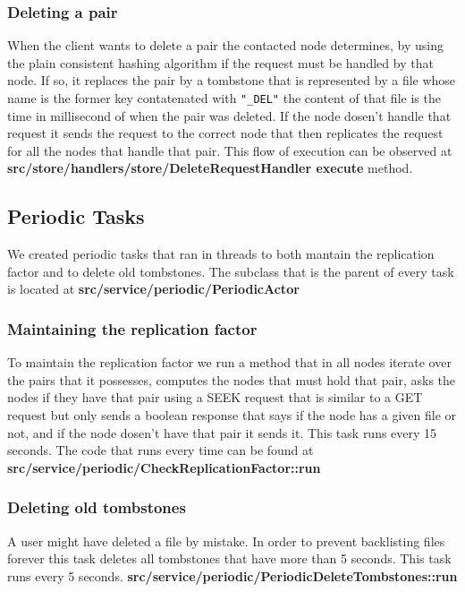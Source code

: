 \subsubsection{Deleting a pair}
When the client wants to delete a pair the contacted node determines, by using the plain consistent hashing algorithm if the request must be handled by that node. If so, it replaces the pair by a tombstone that is represented by a file whose name is the former key contatenated with \texttt{"\_DEL"} the content of that file is the time in millisecond of when the pair was deleted. If the node dosen't handle that request it sends the request to the correct node that then replicates the request for all the nodes that handle that pair. This flow of execution can be observed at \textbf{src/store/handlers/store/DeleteRequestHandler execute} method.

\subsection{Periodic Tasks}
We created periodic tasks that ran in threads to both mantain the replication factor and to delete old tombstones. The subclass that is the parent of every task is located at \textbf{src/service/periodic/PeriodicActor}
\subsubsection{Maintaining the replication factor}
To maintain the replication factor we run a method that in all nodes iterate over the pairs that it possesses, computes the nodes that must hold that pair, asks the nodes if they have that pair using a SEEK request that is similar to a GET request but only sends a boolean response that says if the node has a given file or not, and if the node dosen't have that pair it sends it. This task runs every 15 seconds. The code that runs every time can be found at \textbf{src/service/periodic/CheckReplicationFactor::run}

\subsubsection{Deleting old tombstones}
A user might have deleted a file by mistake. In order to prevent backlisting files forever this task deletes all tombstones that have more than 5 seconds. This task runs every 5 seconds. \textbf{src/service/periodic/PeriodicDeleteTombstones::run}